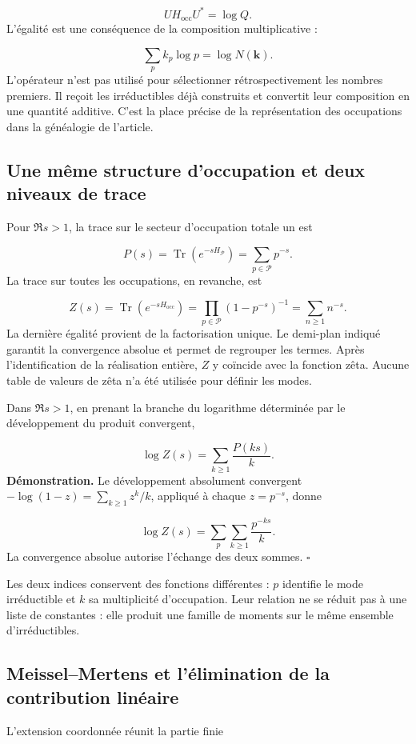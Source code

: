 \[
U H_{\mathrm{occ}}U^*=\log Q.
\]
L'égalité est une conséquence de la composition multiplicative :

\[
\sum_pk_p\log p=\log N(\mathbf k).
\]
L'opérateur n'est pas utilisé pour sélectionner rétrospectivement les nombres premiers. Il reçoit les irréductibles déjà construits et convertit leur composition en une quantité additive. C'est la place précise de la représentation des occupations dans la généalogie de l'article.

\subsection{Une même structure d'occupation et deux niveaux de trace}
Pour $\Re s>1$, la trace sur le secteur d'occupation totale un est

\[
P(s)=\operatorname{Tr}(e^{-sH_{\mathcal P}})=\sum_{p\in\mathcal P}p^{-s}.
\]
La trace sur toutes les occupations, en revanche, est

\[
Z(s)=\operatorname{Tr}(e^{-sH_{\mathrm{occ}}})
=\prod_{p\in\mathcal P}(1-p^{-s})^{-1}
=\sum_{n\ge1}n^{-s}.
\]
La dernière égalité provient de la factorisation unique. Le demi-plan indiqué garantit la convergence absolue et permet de regrouper les termes. Après l’identification de la réalisation entière, $Z$ y coïncide avec la fonction zêta. Aucune table de valeurs de zêta n’a été utilisée pour définir les modes.

Dans $\Re s>1$, en prenant la branche du logarithme déterminée par le développement du produit convergent,

\[
\log Z(s)=\sum_{k\ge1}\frac{P(ks)}{k}.
\]
\textbf{Démonstration.} Le développement absolument convergent $-\log(1-z)=\sum_{k\ge1}z^k/k$, appliqué à chaque $z=p^{-s}$, donne

\[
\log Z(s)=\sum_p\sum_{k\ge1}\frac{p^{-ks}}k.
\]
La convergence absolue autorise l'échange des deux sommes. \hfill\(\square\)

Les deux indices conservent des fonctions différentes : $p$ identifie le mode irréductible et $k$ sa multiplicité d'occupation. Leur relation ne se réduit pas à une liste de constantes : elle produit une famille de moments sur le même ensemble d'irréductibles.

\subsection{Meissel–Mertens et l'élimination de la contribution linéaire}
L'extension coordonnée réunit la partie finie

